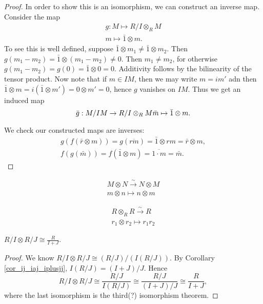 \documentclass[12pt]{article}
\begin{document}
\begin{proof}
	In order to show this is an isomorphism, we can construct an inverse map. Consider the map 
	\begin{gather*}
		g: M \mapsto R/I \otimes_R M \\
		m \mapsto \bar{1}\otimes m.
	\end{gather*}
	To see this is well defined, suppose $\bar{1}\otimes m_1 \neq \bar{1}\otimes m_2$. Then $g(m_1-m_2)=\bar{1}\otimes(m_1-m_2)\neq 0$. Then $m_1\neq m_2$, for otherwise $g(m_1-m_2)=g(0)=\bar{1}\otimes 0=0$. Additivity follows by the bilinearity of the tensor product. Now note that if $m\in IM$, then we may write $m=im'$ adn then $\bar{1}\otimes m=i(\bar{1}\otimes m') = 0\otimes m'=0$, hence $g$ vanishes on $IM$. Thus we get an induced map 
	\begin{equation*}
		\bar{g}: M/IM \to R/I\otimes_R M \\
		\bar{m} \mapsto \bar{1}\otimes m.
	\end{equation*}

	We check our constructed maps are inverses:
	\begin{gather*}
		g(f(\bar{r}\otimes m)) = g(\overline{rm}) = \bar{1}\otimes rm = \bar{r}\otimes m, \\
		f(g(\bar{m})) = f(\bar{1}\otimes m) = \overline{1\cdot m} = \bar{m}.
	\end{gather*}
\end{proof}

\begin{corollary}
	\begin{gather*}
		M\otimes N \overset{\sim}{\to} N\otimes M \\
		m\otimes n \mapsto n\otimes m
	\end{gather*}
\end{corollary}

\begin{corollary}
	\begin{gather*}
		R\otimes_R R\overset{\sim}{\to} R \\
		r_1\otimes r_2 \mapsto r_1r_2
	\end{gather*}
\end{corollary}

\begin{corollary}
	$R/I \otimes R/J \cong \frac{R}{I+J}$.
\end{corollary}
\begin{proof}
	We know $R/I\otimes R/J \cong (R/J)/(I(R/J))$. By Corollary \ref{cor_ij_iaj_iplusjj}, $I(R/J)=(I+J)/J$. Hence 
	\begin{equation*}
		R/I \otimes R/J \cong \frac{R/J}{I(R/J)} \cong \frac{R/J}{(I+J)/J} \cong \frac{R}{I+J},
	\end{equation*}
	where the last isomorphism is the third(?) isomorphism theorem.
\end{proof}
\end{document}
